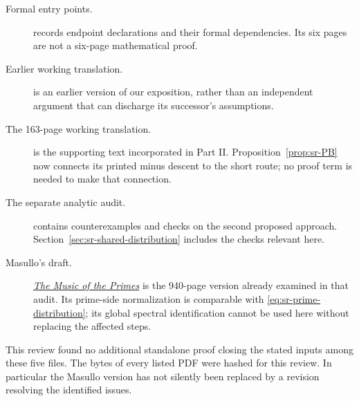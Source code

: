 \begin{description}
\item[Formal entry points.]
\href{https://principia-math.com/api/ws/files/402cfc03e76bc4f9eafd0eb930a80a20}{}
records endpoint declarations and their formal dependencies.
Its six pages are not a six-page mathematical proof.
\item[Earlier working translation.]
\href{https://principia-math.com/api/ws/files/259cf87468cc745b1e81e358086a251e}{}
is an earlier version of our exposition, rather than an independent
argument that can discharge its successor's assumptions.
\item[The 163-page working translation.]
\href{https://principia-math.com/api/ws/files/8ca901b46a918a9293164d6a63d1ea7e}{}
is the supporting text incorporated in Part II.
Proposition~\ref{prop:sr-PB} now connects its printed minus descent to the
short route; no proof term is needed to make that connection.
\item[The separate analytic audit.]
\href{https://principia-math.com/api/ws/files/b561b940f8dd3d3b8f8a2d1d83b359dc}{}
contains counterexamples and checks on the second proposed approach.
Section~\ref{sec:sr-shared-distribution} includes the checks relevant here.
\item[Masullo's draft.]
\href{https://principia-math.com/api/ws/files/e8e3c2bb97f9bf324d74bff487bfb435}{\emph{The Music of the Primes}}
is the 940-page version already examined in that audit.
Its prime-side normalization is comparable with
\eqref{eq:sr-prime-distribution}; its global spectral identification
cannot be used here without replacing the affected steps.
\end{description}
This review found no additional standalone proof closing the stated
inputs among these five files. The bytes of every listed PDF were hashed for this review.
In particular the Masullo version has not silently been replaced by
a revision resolving the identified issues.

